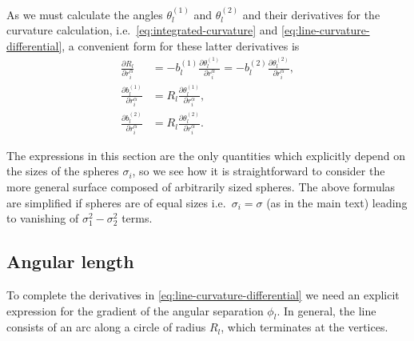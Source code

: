 \documentclass[11pt,twoside]{report}
\begin{document}
As we must calculate the angles $\theta_l^{(1)}$ and $\theta_l^{(2)}$ and their derivatives for the curvature calculation, i.e.\ \eqref{eq:integrated-curvature} and \eqref{eq:line-curvature-differential}, a convenient form for these latter derivatives is
\begin{subequations}
\begin{align}
  \frac{\partial R_l}{\partial r_i^\alpha} &
  = - b_l^{(1)} \frac{\partial\theta_l^{(1)}}{\partial r_i^\alpha}
  = - b_l^{(2)} \frac{\partial\theta_l^{(2)}}{\partial r_i^\alpha}, \\
  \frac{\partial b_l^{(1)}}{\partial r_i^\alpha} &=
  R_l \frac{\partial\theta_l^{(1)}}{\partial r_i^\alpha}, \\
  \frac{\partial b_l^{(2)}}{\partial r_i^\alpha} &=
  R_l \frac{\partial\theta_l^{(2)}}{\partial r_i^\alpha}.
\end{align}
\end{subequations}

The expressions in this section are the only quantities which explicitly depend on the sizes of the spheres $\sigma_i$, so we see how it is straightforward to consider the more general surface composed of arbitrarily sized spheres.
The above formulas are simplified if spheres are of equal sizes i.e.\ $\sigma_i = \sigma$ (as in the main text) leading to vanishing of $\sigma_1^2 - \sigma_2^2$ terms.

\subsection{Angular length}

To complete the derivatives in \eqref{eq:line-curvature-differential} we need an explicit expression for the gradient of the angular separation $\phi_l$.
In general, the line consists of an arc along a circle of radius $R_l$, which terminates at the vertices.
\end{document}
